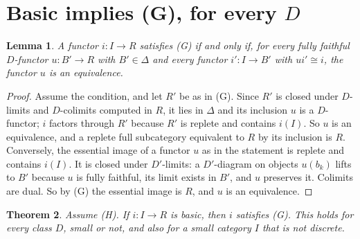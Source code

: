 \documentclass[11pt,a4paper]{amsart}
\newtheorem{theorem}{Theorem}[section]
\newtheorem{lemma}[theorem]{Lemma}
\theoremstyle{definition}
\theoremstyle{remark}
\begin{document}
\section{Basic implies (G), for every $D$}\label{sec:basicG}

\begin{lemma}\label{l:ff}
A functor $i\colon I\to R$ satisfies (G) if and only if, for every fully faithful $D$-functor $u\colon B'\to R$ with $B'\in\Delta$ and every functor $i'\colon I\to B'$ with $ui'\cong i$, the functor $u$ is an equivalence.
\end{lemma}

\begin{proof}
Assume the condition, and let $R'$ be as in (G). Since $R'$ is closed under $D$-limits and $D$-colimits computed in $R$, it lies in $\Delta$ and its inclusion $u$ is a $D$-functor; $i$ factors through $R'$ because $R'$ is replete and contains $i(I)$. So $u$ is an equivalence, and a replete full subcategory equivalent to $R$ by its inclusion is $R$. Conversely, the essential image of a functor $u$ as in the statement is replete and contains $i(I)$. It is closed under $D'$-limits: a $D'$-diagram on objects $u(b_k)$ lifts to $B'$ because $u$ is fully faithful, its limit exists in $B'$, and $u$ preserves it. Colimits are dual. So by (G) the essential image is $R$, and $u$ is an equivalence.
\end{proof}

\begin{theorem}\label{t:basicG}
Assume (H). If $i\colon I\to R$ is basic, then $i$ satisfies (G). This holds for every class $D$, small or not, and also for a small category $I$ that is not discrete.
\end{theorem}
\end{document}
